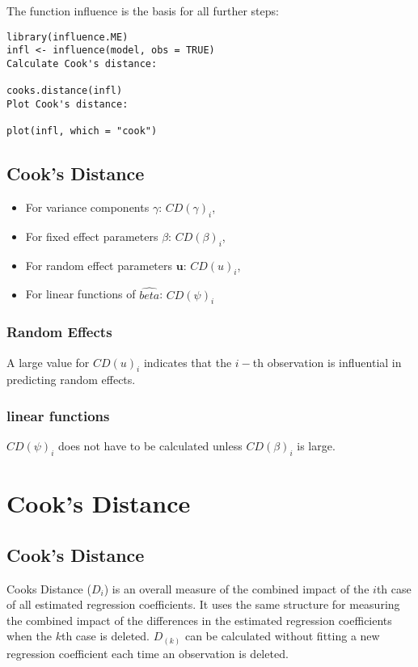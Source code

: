 \documentclass[12pt, a4paper]{article}
\begin{document}
The function influence is the basis for all further steps:

\begin{verbatim}
library(influence.ME)
infl <- influence(model, obs = TRUE)
Calculate Cook's distance:

cooks.distance(infl)
Plot Cook's distance:

plot(infl, which = "cook")
\end{verbatim}


\subsection{Cook's Distance}
\begin{itemize}
	\item For variance components $\gamma$: $CD(\gamma)_i$,
	\item For fixed effect parameters $\beta$: $CD(\beta)_i$,
	\item For random effect parameters $\boldsymbol{u}$: $CD(u)_i$,
	\item For linear functions of $\hat{beta}$: $CD(\psi)_i$
\end{itemize}



\newpage
\subsubsection{Random Effects}


A large value for $CD(u)_i$ indicates that the $i-$th observation is influential in predicting random effects.


\subsubsection{linear functions}


$CD(\psi)_i$ does not have to be calculated unless $CD(\beta)_i$ is large.

\section{Cook's Distance} %

\subsection{Cook's Distance}%
Cooks Distance ($D_{i}$) is an overall measure of the combined impact of the $i$th case of all estimated regression coefficients. It uses the same structure for measuring the combined impact of the differences in the estimated regression coefficients when the $k$th case is deleted. $D_{(k)}$ can be calculated without fitting
a new regression coefficient each time an observation is deleted.
\end{document}
